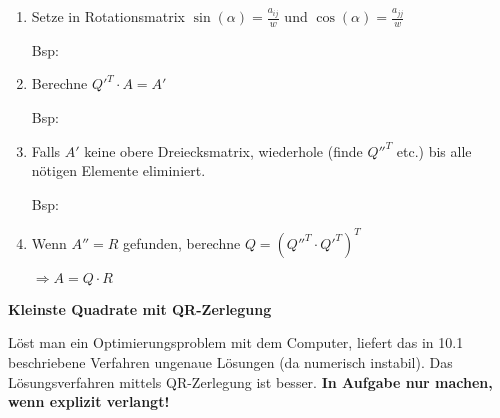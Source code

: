 {\begin{enumerate}[label=\protect\circled{\arabic*}]
\item Setze in Rotationsmatrix $\sin(\alpha) = \frac{a_{ij}}{w}$ und $\cos(\alpha) = \frac{a_{jj}}{w}$ \par
\vskip2pt Bsp:  \vskip3pt

\item Berechne $Q'^T\cdot A = A'$\par
\vskip2pt Bsp:  \vskip3pt

\item Falls $A'$ keine obere Dreiecksmatrix, wiederhole (finde $Q''^T$ etc.) bis alle nötigen Elemente eliminiert.\par
\vskip2pt Bsp:  \vskip3pt

\item Wenn $A'' = R$ gefunden, berechne $Q = (Q''^T\cdot Q'^T)^T$ \par $\Longrightarrow A = Q\cdot R$

\end{enumerate}
\vskip5pt
\textbf{Kleinste Quadrate mit QR-Zerlegung} \par
Löst man ein Optimierungsproblem mit dem Computer, liefert das in 10.1 beschriebene Verfahren ungenaue Lösungen (da numerisch instabil). Das Lösungsverfahren mittels QR-Zerlegung ist besser. \textbf{In Aufgabe nur machen, wenn explizit verlangt!} \vskip5pt

}
